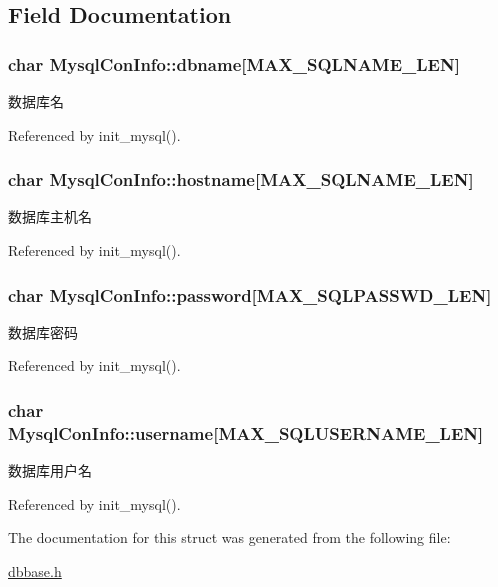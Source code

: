 \subsection{Field Documentation}
\hypertarget{structMysqlConInfo_a82550a94a5bc9800f388752f01964c1c}{
\subsubsection[{dbname}]{\setlength{\rightskip}{0pt plus 5cm}char Mysql\-Con\-Info\-::dbname\mbox{[}{\bf M\-A\-X\-\_\-\-S\-Q\-L\-N\-A\-M\-E\-\_\-\-L\-E\-N}\mbox{]}}}\label{structMysqlConInfo_a82550a94a5bc9800f388752f01964c1c}


数据库名 



Referenced by init\-\_\-mysql().

\hypertarget{structMysqlConInfo_a9382fdbd16ae319c1ad0a76b2362bd46}{
\subsubsection[{hostname}]{\setlength{\rightskip}{0pt plus 5cm}char Mysql\-Con\-Info\-::hostname\mbox{[}{\bf M\-A\-X\-\_\-\-S\-Q\-L\-N\-A\-M\-E\-\_\-\-L\-E\-N}\mbox{]}}}\label{structMysqlConInfo_a9382fdbd16ae319c1ad0a76b2362bd46}


数据库主机名 



Referenced by init\-\_\-mysql().

\hypertarget{structMysqlConInfo_a429e8aae687715a9ec374435c026f939}{
\subsubsection[{password}]{\setlength{\rightskip}{0pt plus 5cm}char Mysql\-Con\-Info\-::password\mbox{[}{\bf M\-A\-X\-\_\-\-S\-Q\-L\-P\-A\-S\-S\-W\-D\-\_\-\-L\-E\-N}\mbox{]}}}\label{structMysqlConInfo_a429e8aae687715a9ec374435c026f939}


数据库密码 



Referenced by init\-\_\-mysql().

\hypertarget{structMysqlConInfo_a2753d5c9d81aba6435ad503db842775d}{
\subsubsection[{username}]{\setlength{\rightskip}{0pt plus 5cm}char Mysql\-Con\-Info\-::username\mbox{[}{\bf M\-A\-X\-\_\-\-S\-Q\-L\-U\-S\-E\-R\-N\-A\-M\-E\-\_\-\-L\-E\-N}\mbox{]}}}\label{structMysqlConInfo_a2753d5c9d81aba6435ad503db842775d}


数据库用户名 



Referenced by init\-\_\-mysql().



The documentation for this struct was generated from the following file\-:\begin{DoxyCompactItemize}
\item 
\hyperlink{dbbase_8h}{dbbase.\-h}\end{DoxyCompactItemize}

